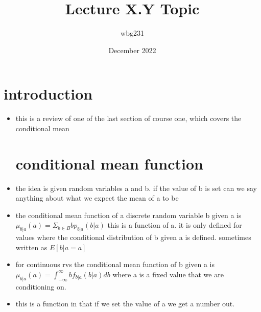 \documentclass{article}
\title{Lecture X.Y Topic}
\author{wbg231 }
\date{December 2022}
\begin{document}
\maketitle

\section{introduction}
\begin{itemize}
\item this is a review of one of the last section of course one, which covers the conditional mean 
\section{conditional mean function }
\item the idea is given random variables a and b. if the value of b is set can we say anything about what we expect the mean of  a to be
\item the conditional mean function of a discrete random variable b given a is $\mu_{b|a}(a)=\Sigma_{b\in B}bp_{b|a}(b|a)$ this is a function of a. it is only defined for values where the conditional distribution of b given a is defined. sometimes written as $E[b|a=a]$
\item for continuous rvs the conditional mean function of b given a is $\mu_{b|a}(a)=\int_{-\infty}^{\infty}bf_{b|a}(b|a)db$ where a is a fixed value that we are conditioning on. 
\item this is a function in that if we set the value of a we get a number out. 

\end{itemize}
\end{document}
